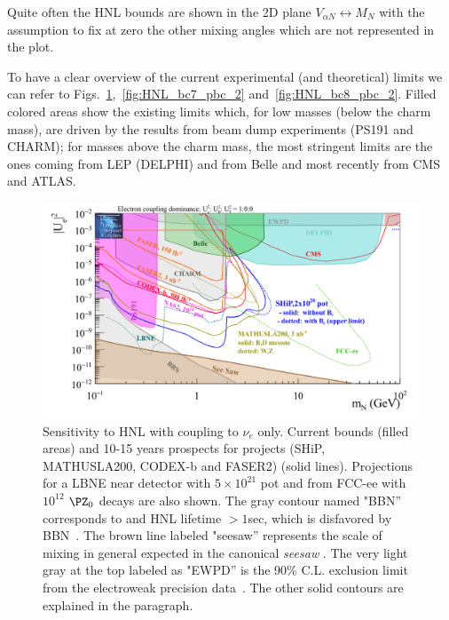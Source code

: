 Quite often the HNL bounds are shown in the 2D plane $V_{\alpha N} \longleftrightarrow
M_N$ with the assumption to fix at zero the other mixing angles which are not
represented in the plot. 

To have a clear overview of the current experimental (and theoretical)
limits we can refer to
Figs.~\ref{fig:HNL_bc6_pbc_2},~\ref{fig:HNL_bc7_pbc_2}
and~\ref{fig:HNL_bc8_pbc_2}. Filled colored areas show the existing
limits which, for low masses (below the charm mass), are driven by the
results from beam dump experiments (PS191 and CHARM); for masses above
the charm mass, the most stringent limits are the ones coming from LEP
(DELPHI) and from Belle and most recently from CMS and ATLAS.



\begin{figure}[h]
  \centering
  \includegraphics[width=.90\textwidth]{Figures/c3/HNL_bc6_pbc_2.png}
    \caption{Sensitivity to HNL with coupling to $\nu_e$ only. Current bounds (filled areas) and 10-15 years prospects for projects
(SHiP, MATHUSLA200, CODEX-b and FASER2) (solid lines). Projections for a LBNE
near detector with $5\times 10^{21}$ pot and from FCC-ee with
$10^{12}$ $\PZ_0$ decays are also shown.
The gray contour named "BBN'' corresponds to and HNL lifetime $>1$sec,
which is disfavored by BBN~\cite{Ruchayskiy_2012}. The brown line
labeled "seesaw'' represents the scale of mixing in general expected
in the canonical \emph{seesaw }. The very light gray at the top
labeled as "EWPD'' is the 90\% C.L. exclusion limit from the
electroweak precision data~\cite{Antusch_2015}. The other solid
contours are explained in the paragraph. 
}
  \label{fig:HNL_bc6_pbc_2}
\end{figure}

